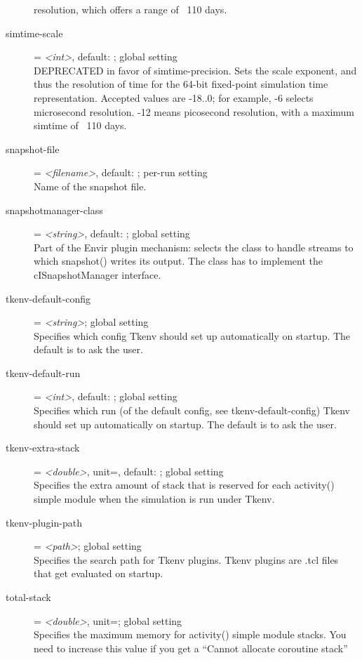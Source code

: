 \begin{description}
    resolution, which offers a range of ~110 days.
\item[simtime-scale] = \textit{<int>}, default: ; global setting \\
    DEPRECATED in favor of simtime-precision. Sets the scale exponent, and thus
    the resolution of time for the 64-bit fixed-point simulation time
    representation. Accepted values are -18..0; for example, -6 selects
    microsecond resolution. -12 means picosecond resolution, with a maximum
    simtime of ~110 days.
\item[snapshot-file] = \textit{<filename>}, default: ; per-run setting \\
    Name of the snapshot file.
\item[snapshotmanager-class] = \textit{<string>}, default: ; global setting \\
    Part of the Envir plugin mechanism: selects the class to handle streams to
    which snapshot() writes its output. The class has to implement the
    cISnapshotManager interface.
\item[tkenv-default-config] = \textit{<string>}; global setting \\
    Specifies which config Tkenv should set up automatically on startup. The
    default is to ask the user.
\item[tkenv-default-run] = \textit{<int>}, default: ; global setting \\
    Specifies which run (of the default config, see tkenv-default-config) Tkenv
    should set up automatically on startup. The default is to ask the user.
\item[tkenv-extra-stack] = \textit{<double>}, unit=, default: ; global setting \\
    Specifies the extra amount of stack that is reserved for each activity()
    simple module when the simulation is run under Tkenv.
\item[tkenv-plugin-path] = \textit{<path>}; global setting \\
    Specifies the search path for Tkenv plugins. Tkenv plugins are .tcl files
    that get evaluated on startup.
\item[total-stack] = \textit{<double>}, unit=; global setting \\
    Specifies the maximum memory for activity() simple module stacks. You need
    to increase this value if you get a ``Cannot allocate coroutine stack''

\end{description}
